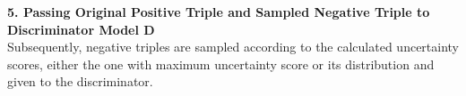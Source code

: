 \textbf{5. Passing Original Positive Triple and Sampled Negative Triple to Discriminator Model D}\\
Subsequently, negative triples are sampled according to the calculated uncertainty scores, either the one with maximum uncertainty score or its distribution and given to the discriminator.
